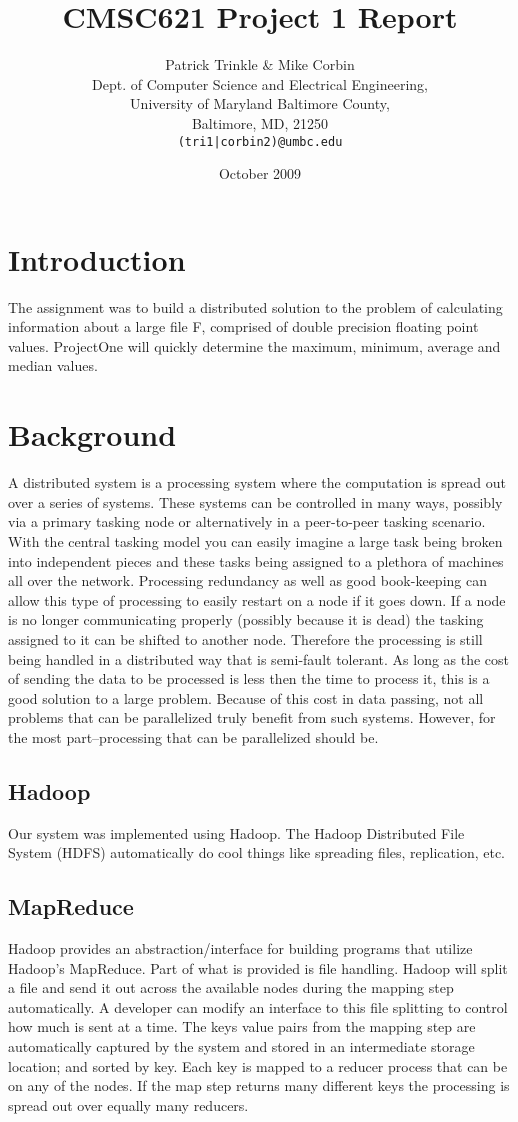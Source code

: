 \documentclass[11pt]{article}
\title{CMSC621 Project 1 Report}
\author{Patrick Trinkle \& Mike Corbin\\
Dept. of Computer Science and Electrical Engineering,\\
University of Maryland Baltimore County,\\
Baltimore, MD, 21250\\
\texttt{(tri1|corbin2)@umbc.edu}}
\date{October 2009}
\begin{document}
\maketitle

\section{Introduction}
The assignment was to build a distributed solution to the problem of calculating information about a large file F, comprised of double precision floating point values.  ProjectOne will quickly determine the maximum, minimum, average and median values.

\section{Background}
A distributed system is a processing system where the computation is spread out over a series of systems.  These systems can be controlled in many ways, possibly via a primary tasking node or alternatively in a peer-to-peer tasking scenario.  With the central tasking model you can easily imagine a large task being broken into independent pieces and these tasks being assigned to a plethora of machines all over the network.  Processing redundancy as well as good book-keeping can allow this type of processing to easily restart on a node if it goes down.  If a node is no longer communicating properly (possibly because it is dead) the tasking assigned to it can be shifted to another node.  Therefore the processing is still being handled in a distributed way that is semi-fault tolerant.  As long as the cost of sending the data to be processed is less then the time to process it, this is a good solution to a large problem.  Because of this cost in data passing, not all problems that can be parallelized truly benefit from such systems.  However, for the most part--processing that can be parallelized should be.

\subsection{Hadoop}
Our system was implemented using Hadoop.  The Hadoop Distributed File System (HDFS) automatically do cool things like spreading files, replication, etc.

\subsection{MapReduce}
Hadoop provides an abstraction/interface for building programs that utilize Hadoop's MapReduce.  Part of what is provided is file handling.  Hadoop will split a file and send it out across the available nodes during the mapping step automatically.  A developer can modify an interface to this file splitting to control how much is sent at a time.  The keys value pairs from the mapping step are automatically captured by the system and stored in an intermediate storage location; and sorted by key.  Each key is mapped to a reducer process that can be on any of the nodes.  If the map step returns many different keys the processing is spread out over equally many reducers.
\end{document}
